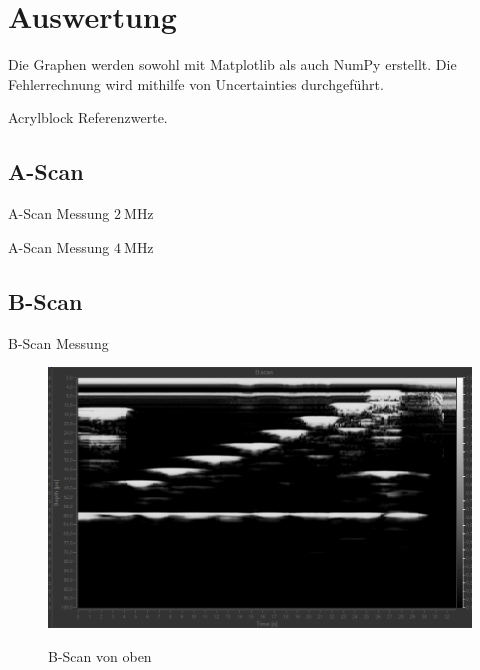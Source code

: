 \section{Auswertung}
\label{sec:Auswertung}

Die Graphen werden sowohl mit Matplotlib \cite{matplotlib} als auch NumPy \cite{numpy} erstellt. Die Fehlerrechnung wird mithilfe von Uncertainties \cite{uncertainties} durchgeführt.

\begin{table}
	\centering
	\caption{Acrylblock Referenzwerte.}
	
	\label{tab:AScanRef}
\end{table}

\subsection{A-Scan}

\begin{table}
	\centering
	\caption{A-Scan Messung $\SI{2}{\mega\hertz}$}
	
	\label{tab:AScan2MHz}
\end{table}

\begin{table}
	\centering
	\caption{A-Scan Messung $\SI{4}{\mega\hertz}$}
	
	\label{tab:AScan4MHz}
\end{table}

\subsection{B-Scan}

\begin{table}
	\centering
	\caption{B-Scan Messung}
	
	\label{tab:BScan}
\end{table}

\begin{figure}
	\centering
	\caption{B-Scan von oben}
	\includegraphics[width=\linewidth-40pt,height=\textheight-40pt,keepaspectratio]{content/images/B-Scan-oben.jpg}
	\label{fig:B-Scan-oben}
\end{figure}


